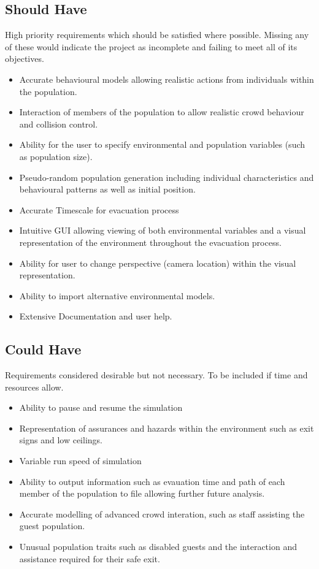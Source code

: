\subsection{Should Have}

High priority requirements which should be satisfied where possible.
Missing any of these would indicate the project as incomplete and
failing to meet all of its objectives.
\begin{itemize}
\item Accurate behavioural models allowing realistic actions from individuals
within the population.
\item Interaction of members of the population to allow realistic crowd
behaviour and collision control.
\item Ability for the user to specify environmental and population variables
(such as population size).
\item Pseudo-random population generation including individual characteristics
and behavioural patterns as well as initial position.
\item Accurate Timescale for evacuation process
\item Intuitive GUI allowing viewing of both environmental variables and
a visual representation of the environment throughout the evacuation
process.
\item Ability for user to change perspective (camera location) within the
visual representation.
\item Ability to import alternative environmental models.
\item Extensive Documentation and user help.
\end{itemize}

\subsection{Could Have}

Requirements considered desirable but not necessary. To be included
if time and resources allow.
\begin{itemize}
\item Ability to pause and resume the simulation
\item Representation of assurances and hazards within the environment such
as exit signs and low ceilings.
\item Variable run speed of simulation
\item Ability to output information such as evauation time and path of each
member of the population to file allowing further future analysis.
\item Accurate modelling of advanced crowd interation, such as staff assisting
the guest population.
\item Unusual population traits such as disabled guests and the interaction
and assistance required for their safe exit.
\end{itemize}

